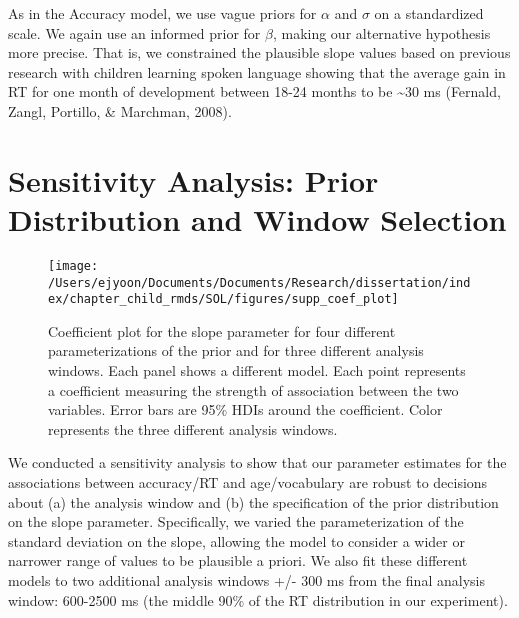\documentclass[oneside]{report}
\begin{document}
As in the Accuracy model, we use vague priors for \(\alpha\) and
\(\sigma\) on a standardized scale. We again use an informed prior for
\(\beta\), making our alternative hypothesis more precise. That is, we
constrained the plausible slope values based on previous research with
children learning spoken language showing that the average gain in RT
for one month of development between 18-24 months to be
\textasciitilde{}30 ms (Fernald, Zangl, Portillo, \& Marchman, 2008).

\section{Sensitivity Analysis: Prior Distribution and Window
Selection}\label{sensitivity-analysis-prior-distribution-and-window-selection}
\begin{figure}[!t]

{\centering \texttt{[image: /Users/ejyoon/Documents/Documents/Research/dissertation/index/chapter\_child\_rmds/SOL/figures/supp\_coef\_plot]} 

}

\caption[Results of sensitivity analysis for Experiment 1.1.]{Coefficient plot for the slope parameter for four different parameterizations of the prior and for three different analysis windows. Each panel shows a different model. Each point represents a coefficient measuring the strength of association between the two variables. Error bars are 95\% HDIs around the coefficient. Color represents the three different analysis windows.}\label{fig:unnamed-chunk-8}
\end{figure}
We conducted a sensitivity analysis to show that our parameter estimates
for the associations between accuracy/RT and age/vocabulary are robust
to decisions about (a) the analysis window and (b) the specification of
the prior distribution on the slope parameter. Specifically, we varied
the parameterization of the standard deviation on the slope, allowing
the model to consider a wider or narrower range of values to be
plausible a priori. We also fit these different models to two additional
analysis windows +/- 300 ms from the final analysis window: 600-2500 ms
(the middle 90\% of the RT distribution in our experiment).
\end{document}
